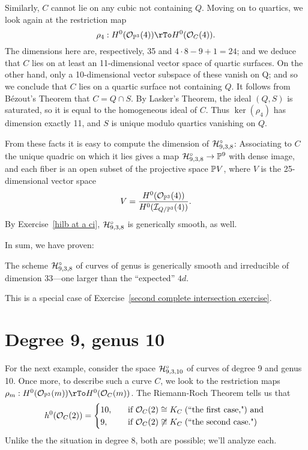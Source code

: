 Similarly, $C$ cannot lie on any cubic not containing $Q$. Moving on to quartics, we look again at the restriction map
$$
\rho_4 : H^0(\cO_{\PP^3}(4)) \rTo H^0(\cO_C(4)).
$$
The dimensions here are, respectively, 35 and $4\cdot 8 - 9 + 1 = 24$; and we deduce that $C$ lies on at least an 11-dimensional vector space of quartic surfaces. On the other hand, only a 10-dimensional vector subspace of these vanish on Q; and so we conclude that $C$ lies on a quartic surface not containing $Q$. It follows from B\'ezout's Theorem that $C = Q \cap S$. By Lasker's Theorem, the ideal $(Q,S)$ is saturated, so it is equal to the homogeneous ideal of $C$. Thus $\ker(\rho_4)$ has dimension exactly 11, and  $S$ is unique modulo quartics vanishing on $Q$.

From these facts it is easy to compute the dimension of  $\cH^\circ_{9,3,8}$: Associating to $C$ the unique quadric on which it lies gives a map $\cH^\circ_{9,3,8} \to \PP^9$ with dense image, and each fiber is an open subset of the projective space $\PP V$, where $V$ is the 25-dimensional vector space
$$
V = \frac{H^0(\cO_{\PP^3}(4))}{H^0(\cI_{Q/\PP^3}(4))}.
$$
By Exercise~\ref{hilb at a ci}, $\cH^\circ_{9,3,8}$ is generically smooth, as well.

In sum, we have proven:
\begin{proposition}
 The scheme $\cH^\circ_{9,3,8}$ of curves of genus  is generically smooth and irreducible of dimension 33---one larger than the ``expected'' $4d$.
\end{proposition}

This is a special case of Exercise~\ref{second complete intersection exercise}.

\section{Degree 9, genus 10}\label{deg9 section}

For the next example, consider the space $\cH^\circ_{9,3,10}$ of curves of degree 9 and genus 10. Once more, to describe such a curve $C$, we look to the restriction maps $\rho_m: H^0(\cO_{\PP^3}(m)) \rTo H^0(\cO_C(m))$. The Riemann-Roch Theorem tells us that
\begin{align*}
h^0(\cO_C(2)) =
\begin{cases}
10, \quad &\text{if } \cO_C(2) \cong K_C \; \text{(``the first case,") and } \\
9,  \quad &\text{if } \cO_C(2) \not\cong K_C  \; \text{(``the second case.")}
\end{cases}
\end{align*}
Unlike the the situation in degree 8, both are possible; we'll analyze each.

